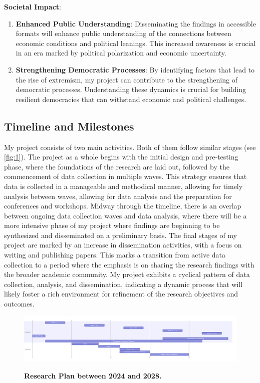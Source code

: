 \documentclass[letterpaper]{article}
\renewenvironment{itemize}{
  \begin{list}{}{
    \setlength{\leftmargin}{1.5em}
  }
}{
  \end{list}
}
\begin{document}
\begin{itemize}
  \item {\bf Societal Impact}: 
    \begin{enumerate}
      \item {\bf Enhanced Public Understanding}: Disseminating the findings in accessible formats will enhance public understanding of the connections between economic conditions and political leanings. This increased awareness is crucial in an era marked by political polarization and economic uncertainty.
      \item {\bf Strengthening Democratic Processes}: By identifying factors that lead to the rise of extremism, my project can contribute to the strengthening of democratic processes. Understanding these dynamics is crucial for building resilient democracies that can withstand economic and political challenges.
    \end{enumerate}

\end{itemize}

\subsection*{Timeline and Milestones}

My project consists of two main activities. Both of them follow similar stages (see \autoref{fig:1}). The project as a whole begins with the initial design and pre-testing phase, where the foundations of the research are laid out, followed by the commencement of data collection in multiple waves. This strategy ensures that data is collected in a manageable and methodical manner, allowing for timely analysis between waves, allowing for data analysis and the preparation for conferences and workshops. Midway through the timeline, there is an overlap between ongoing data collection waves and data analysis, where there will be a more intensive phase of my project where findings are beginning to be synthesized and disseminated on a preliminary basis. The final stages of my project are marked by an increase in dissemination activities, with a focus on writing and publishing papers. This marks a transition from active data collection to a period where the emphasis is on sharing the research findings with the broader academic community. My project exhibits a cyclical pattern of data collection, analysis, and dissemination, indicating a dynamic process that will likely foster a rich environment for refinement of the research objectives and outcomes.

\begin{figure}[h]
\caption{{\bf Research Plan between 2024 and 2028.}}
\includegraphics[width=\textwidth]{gantt.png} 
\label{fig:1}
\end{figure}
\end{document}
